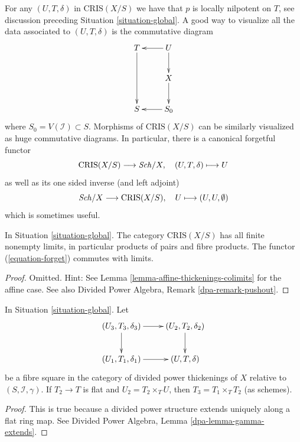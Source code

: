 \noindent
For any $(U, T, \delta)$ in $\text{CRIS}(X/S)$
we have that $p$ is locally nilpotent on $T$, see discussion preceding
Situation \ref{situation-global}.
A good way to visualize all the data associated to $(U, T, \delta)$
is the commutative diagram
$$
\xymatrix{
T \ar[dd] & U \ar[l] \ar[d] \\
& X \ar[d] \\
S & S_0 \ar[l]
}
$$
where $S_0 = V(\mathcal{I}) \subset S$. Morphisms of $\text{CRIS}(X/S)$
can be similarly visualized as huge commutative diagrams. In particular,
there is a canonical forgetful functor
\begin{equation}
\label{equation-forget}
\text{CRIS}(X/S) \longrightarrow \mathit{Sch}/X,\quad
(U, T, \delta) \longmapsto U
\end{equation}
as well as its one sided inverse (and left adjoint)
\begin{equation}
\label{equation-endow-trivial}
\mathit{Sch}/X \longrightarrow \text{CRIS}(X/S),\quad
U \longmapsto (U, U, \emptyset)
\end{equation}
which is sometimes useful.

\begin{lemma}
\label{lemma-divided-power-thickening-fibre-products}
In Situation \ref{situation-global}.
The category $\text{CRIS}(X/S)$ has all finite nonempty limits,
in particular products of pairs and fibre products.
The functor (\ref{equation-forget}) commutes with limits.
\end{lemma}

\begin{proof}
Omitted. Hint: See Lemma \ref{lemma-affine-thickenings-colimits}
for the affine case. See also
Divided Power Algebra, Remark \ref{dpa-remark-pushout}.
\end{proof}

\begin{lemma}
\label{lemma-divided-power-thickening-base-change-flat}
In Situation \ref{situation-global}. Let
$$
\xymatrix{
(U_3, T_3, \delta_3) \ar[d] \ar[r] & (U_2, T_2, \delta_2) \ar[d] \\
(U_1, T_1, \delta_1) \ar[r] & (U, T, \delta)
}
$$
be a fibre square in the category of divided power thickenings of
$X$ relative to $(S, \mathcal{I}, \gamma)$. If $T_2 \to T$ is
flat and $U_2 = T_2 \times_T U$, then $T_3 = T_1 \times_T T_2$ (as schemes).
\end{lemma}

\begin{proof}
This is true because a divided power structure extends uniquely
along a flat ring map. See
Divided Power Algebra, Lemma \ref{dpa-lemma-gamma-extends}.
\end{proof}

